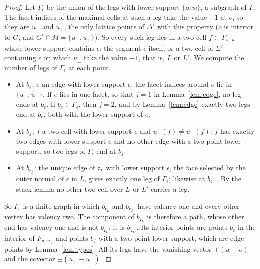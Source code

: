 \begin{proof}
Let $\Gamma_\epsilon$ be the union of the legs with lower support $\{o,w\}$, a subgraph of $\Gamma$. The facet indices of the maximal cells
at such a leg take the value $-1$ at $o$, so they are $u_-$ and $u_+$, the only lattice points of $\Delta^\circ$ with this property ($o$ is
interior to $G$, and $G^\circ\cap M=\{u_-,u_+\}$). So every such leg lies in a two-cell $f\subset F_{u_-u_+}$ whose lower support contains
$\epsilon$: the segment $\epsilon$ itself, or a two-cell of $\Sigma'$ containing $\epsilon$ on which $u_\pm$ take the value $-1$, that is, $L$
or $L'$. We compute the number of legs of $\Gamma_\epsilon$ at each point.
\begin{itemize}
\item At $b_e$, $e$ an edge with lower support $\epsilon$: the facet indices around $e$ lie in $\{u_-,u_+\}$. If $e$ lies in one facet, so
that $j=1$ in Lemma~\ref{lem:edge}, no leg ends at $b_e$. If $b_e\in\Gamma_\epsilon$, then $j=2$, and by Lemma~\ref{lem:edge} exactly two legs
end at $b_e$, both with the lower support of $e$.
\item At $b_f$, $f$ a two-cell with lower support $\epsilon$ and $u_+(f)\ne u_-(f)$: $f$ has exactly two edges with lower support $\epsilon$
and no other edge with a two-point lower support, so two legs of $\Gamma_\epsilon$ end at $b_f$.
\item At $b_{\mathfrak c_L}$: the unique edge of $\mathfrak c_L$ with lower support $\epsilon$, the face selected by the outer normal of
$\epsilon$ in $L$, gives exactly one leg of $\Gamma_\epsilon$; likewise at $b_{\mathfrak c_{L'}}$. By the stack lemma no other two-cell over
$L$ or $L'$ carries a leg.
\end{itemize}
So $\Gamma_\epsilon$ is a finite graph in which $b_{\mathfrak c_L}$ and $b_{\mathfrak c_{L'}}$ have valency one and every other vertex has
valency two. The component of $b_{\mathfrak c_L}$ is therefore a path, whose other end has valency one and is not $b_{\mathfrak c_L}$; it is
$b_{\mathfrak c_{L'}}$. Its interior points are points $b_e$ in the interior of $F_{u_-u_+}$ and points $b_f$ with a two-point lower
support, which are edge points by Lemma~\ref{lem:types}. All its legs have the vanishing vector $\pm(w-o)$ and the covector $\pm(u_+-u_-)$.
\end{proof}

